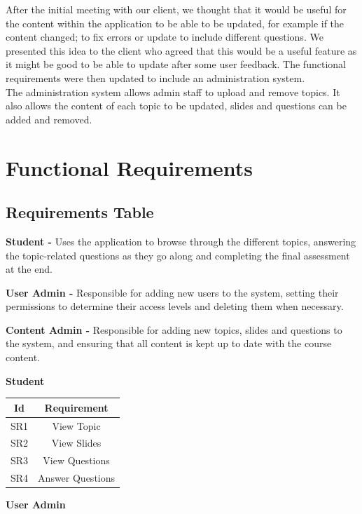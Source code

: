 \documentclass{l3proj}
\begin{document}
After the initial meeting with our client, we thought that it would be useful for the content within the application to be able to be updated, for example if the content changed; to fix errors or update to include different questions. We presented this idea to the client who agreed that this would be a useful feature as it might be good to be able to update after some user feedback. The functional requirements were then updated to include an administration system.\\
The administration system allows admin staff to upload and remove topics. It also allows the content of each topic to be updated, slides and questions can be added and removed.


\section{Functional Requirements}

\subsection{Requirements Table}

\textbf{Student -} Uses the application to browse through the different topics, answering the topic-related questions as they go along and completing the final assessment at the end.

\textbf{User Admin -} Responsible for adding new users to the system, setting their permissions to determine their access levels and deleting them when necessary.

\textbf{Content Admin -} Responsible for adding new topics, slides and questions to the system, and ensuring that all content is kept up to date with the course content.

\textbf{Student}\\

\begin{center}
\begin{tabular}{|c|c|}
\hline \textbf{Id} & \textbf{Requirement}\\
\hline SR1 & View Topic\\
\hline SR2 & View Slides\\
\hline SR3 & View Questions\\
\hline SR4 & Answer Questions\\
\hline 
\end{tabular}
\end{center}

\textbf{User Admin}\\
\end{document}
